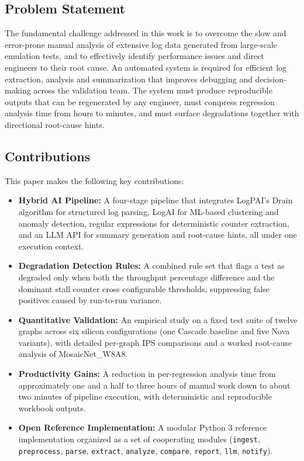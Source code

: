 \documentclass[conference]{IEEEtran}
\begin{document}
\subsection{Problem Statement}
The fundamental challenge addressed in this work is to overcome the slow and error-prone manual analysis of extensive log data generated from large-scale emulation tests, and to effectively identify performance issues and direct engineers to their root cause. An automated system is required for efficient log extraction, analysis and summarization that improves debugging and decision-making across the validation team. The system must produce reproducible outputs that can be regenerated by any engineer, must compress regression analysis time from hours to minutes, and must surface degradations together with directional root-cause hints.

\subsection{Contributions}
This paper makes the following key contributions:
\begin{itemize}
\item \textbf{Hybrid AI Pipeline:} A four-stage pipeline that integrates LogPAI's Drain algorithm for structured log parsing, LogAI for ML-based clustering and anomaly detection, regular expressions for deterministic counter extraction, and an LLM API for summary generation and root-cause hints, all under one execution context.
\item \textbf{Degradation Detection Rules:} A combined rule set that flags a test as degraded only when both the throughput percentage difference and the dominant stall counter cross configurable thresholds, suppressing false positives caused by run-to-run variance.
\item \textbf{Quantitative Validation:} An empirical study on a fixed test suite of twelve graphs across six silicon configurations (one Cascade baseline and five Nova variants), with detailed per-graph IPS comparisons and a worked root-cause analysis of MosaicNet\_W8A8.
\item \textbf{Productivity Gains:} A reduction in per-regression analysis time from approximately one and a half to three hours of manual work down to about two minutes of pipeline execution, with deterministic and reproducible workbook outputs.
\item \textbf{Open Reference Implementation:} A modular Python 3 reference implementation organized as a set of cooperating modules (\texttt{ingest}, \texttt{preprocess}, \texttt{parse}, \texttt{extract}, \texttt{analyze}, \texttt{compare}, \texttt{report}, \texttt{llm}, \texttt{notify}).
\end{itemize}
\end{document}
